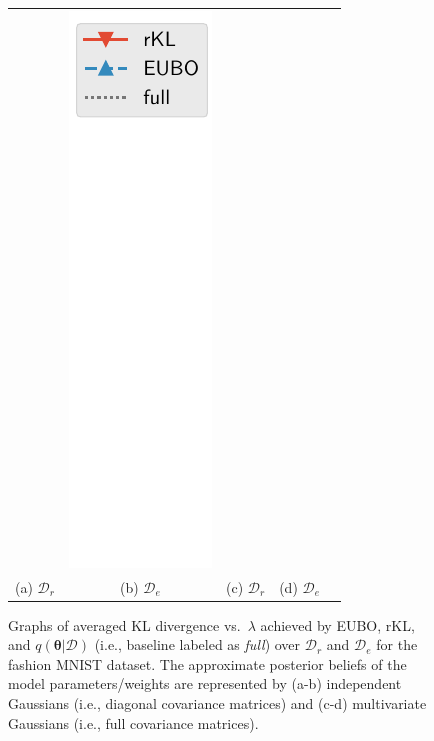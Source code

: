 \documentclass{article}
\theoremstyle{definition}
\newcommand{\mcl}[1]{\mathcal{#1}}
\newcommand{\da}{\mcl{D}}
\newcommand{\dc}{\mcl{D}_r}
\newcommand{\dr}{\mcl{D}_e}
\begin{document}
\begin{figure}
\begin{tabular}[t]{@{}c@{}c@{}c@{}c@{}c@{}}
&
\includegraphics[trim={0mm 20mm 0 0}, clip, height=0.35\textwidth]{img/likelihood_diff/fashionmnist_legend.pdf}\\
(a) $\dc$
&
(b) $\dr$
&
(c) $\dc$
&
(d) $\dr$
&
\end{tabular}
\caption{Graphs of averaged KL divergence vs.~$\lambda$ achieved by EUBO, rKL, and $q(\bm{\theta}|\da)$ (i.e., baseline labeled as \emph{full}) over $\dc$ and $\dr$ for the fashion MNIST dataset. The approximate posterior beliefs of the model parameters/weights are represented by (a-b) independent Gaussians (i.e., diagonal covariance matrices) and (c-d) multivariate Gaussians (i.e., full covariance matrices).}
\label{fig:mnistdiagfull}
\end{figure}
%
\end{document}

